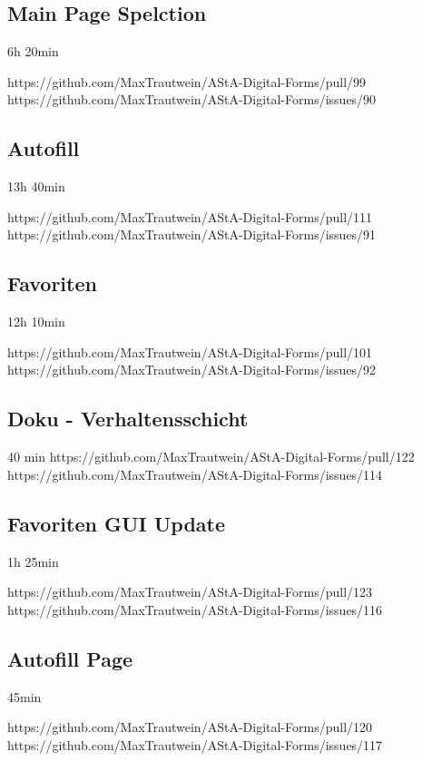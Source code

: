 \subsection{Main Page Spelction}
6h 20min

https://github.com/MaxTrautwein/AStA-Digital-Forms/pull/99
https://github.com/MaxTrautwein/AStA-Digital-Forms/issues/90
\subsection{Autofill}
13h 40min

https://github.com/MaxTrautwein/AStA-Digital-Forms/pull/111
https://github.com/MaxTrautwein/AStA-Digital-Forms/issues/91
\subsection{Favoriten}
12h 10min

https://github.com/MaxTrautwein/AStA-Digital-Forms/pull/101
https://github.com/MaxTrautwein/AStA-Digital-Forms/issues/92
\subsection{Doku - Verhaltensschicht}
40 min
https://github.com/MaxTrautwein/AStA-Digital-Forms/pull/122
https://github.com/MaxTrautwein/AStA-Digital-Forms/issues/114

\subsection{Favoriten GUI Update}
1h 25min

https://github.com/MaxTrautwein/AStA-Digital-Forms/pull/123
https://github.com/MaxTrautwein/AStA-Digital-Forms/issues/116
\subsection{Autofill Page}
45min

https://github.com/MaxTrautwein/AStA-Digital-Forms/pull/120
https://github.com/MaxTrautwein/AStA-Digital-Forms/issues/117
